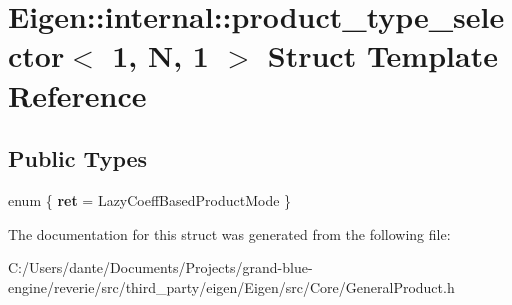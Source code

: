 \hypertarget{struct_eigen_1_1internal_1_1product__type__selector_3_011_00_01_n_00_011_01_4}{}\section{Eigen\+::internal\+::product\+\_\+type\+\_\+selector$<$ 1, N, 1 $>$ Struct Template Reference}
\label{struct_eigen_1_1internal_1_1product__type__selector_3_011_00_01_n_00_011_01_4}
\subsection*{Public Types}
\begin{DoxyCompactItemize}
\item 
\mbox{\label{struct_eigen_1_1internal_1_1product__type__selector_3_011_00_01_n_00_011_01_4_a500af402e0ddca40cab58d9e554780f7}} 
enum \{ {\bfseries ret} = Lazy\+Coeff\+Based\+Product\+Mode
 \}
\end{DoxyCompactItemize}


The documentation for this struct was generated from the following file\+:\begin{DoxyCompactItemize}
\item 
C\+:/\+Users/dante/\+Documents/\+Projects/grand-\/blue-\/engine/reverie/src/third\+\_\+party/eigen/\+Eigen/src/\+Core/General\+Product.\+h\end{DoxyCompactItemize}
